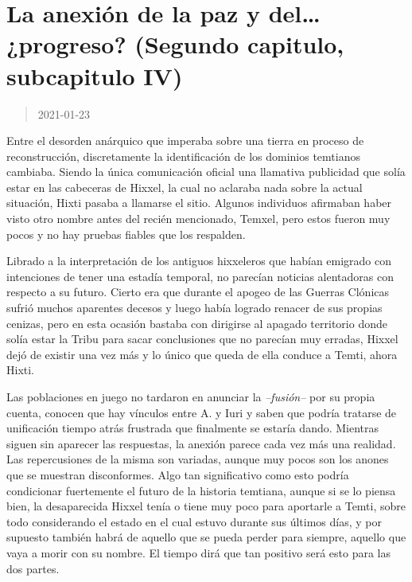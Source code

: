 \documentclass[
  spanish,
]{book}
\begin{document}
\hypertarget{la-anexiuxf3n-de-la-paz-y-del-progreso-segundo-capitulo-subcapitulo-iv}{%
\section{La anexión de la paz y del\ldots{} ¿progreso? (Segundo capitulo, subcapitulo IV)}\label{la-anexiuxf3n-de-la-paz-y-del-progreso-segundo-capitulo-subcapitulo-iv}}

\begin{quote}
2021-01-23
\end{quote}

Entre el desorden anárquico que imperaba sobre una tierra en proceso de reconstrucción, discretamente la identificación de los dominios temtianos cambiaba. Siendo la única comunicación oficial una llamativa publicidad que solía estar en las cabeceras de Hixxel, la cual no aclaraba nada sobre la actual situación, Hixti pasaba a llamarse el sitio. Algunos individuos afirmaban haber visto otro nombre antes del recién mencionado, Temxel, pero estos fueron muy pocos y no hay pruebas fiables que los respalden.

Librado a la interpretación de los antiguos hixxeleros que habían emigrado con intenciones de tener una estadía temporal, no parecían noticias alentadoras con respecto a su futuro. Cierto era que durante el apogeo de las Guerras Clónicas sufrió muchos aparentes decesos y luego había logrado renacer de sus propias cenizas, pero en esta ocasión bastaba con dirigirse al apagado territorio donde solía estar la Tribu para sacar conclusiones que no parecían muy erradas, Hixxel dejó de existir una vez más y lo único que queda de ella conduce a Temti, ahora Hixti.

Las poblaciones en juego no tardaron en anunciar la \emph{--fusión--} por su propia cuenta, conocen que hay vínculos entre A. y Iuri y saben que podría tratarse de unificación tiempo atrás frustrada que finalmente se estaría dando. Mientras siguen sin aparecer las respuestas, la anexión parece cada vez más una realidad. Las repercusiones de la misma son variadas, aunque muy pocos son los anones que se muestran disconformes. Algo tan significativo como esto podría condicionar fuertemente el futuro de la historia temtiana, aunque si se lo piensa bien, la desaparecida Hixxel tenía o tiene muy poco para aportarle a Temti, sobre todo considerando el estado en el cual estuvo durante sus últimos días, y por supuesto también habrá de aquello que se pueda perder para siempre, aquello que vaya a morir con su nombre. El tiempo dirá que tan positivo será esto para las dos partes.
\end{document}
